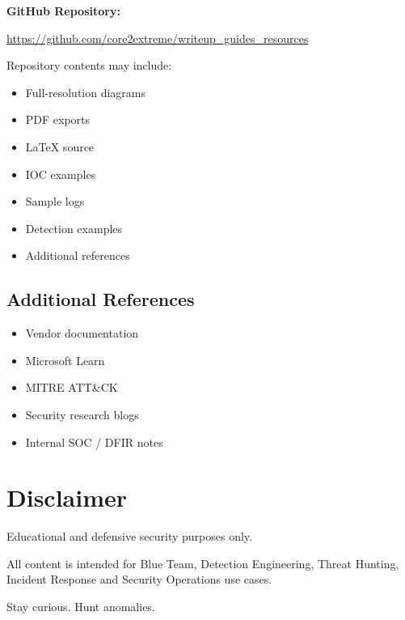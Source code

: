 \documentclass[11pt,a4paper]{article}
\newcommand{\docrepo}{https://github.com/core2extreme/writeup\_guides\_resources}
\newcommand{\docrepourl}{https://github.com/core2extreme/writeup_guides_resources}
\newcommand{\docrepo}{https://github.com/core2extreme/writeup\_guides\_resources}
\newcommand{\docrepourl}{https://github.com/core2extreme/writeup_guides_resources}
\let\oldsection\section
\renewcommand{\section}{\clearpage\oldsection}
\begin{document}
\begin{socbox}
\textbf{GitHub Repository:}

\href{\docrepourl}{\docrepo}

\vspace{0.3cm}

Repository contents may include:

\begin{itemize}
    \item Full-resolution diagrams
    \item PDF exports
    \item LaTeX source
    \item IOC examples
    \item Sample logs
    \item Detection examples
    \item Additional references
\end{itemize}
\end{socbox}

\subsection{Additional References}

\begin{itemize}
    \item Vendor documentation
    \item Microsoft Learn
    \item MITRE ATT\&CK
    \item Security research blogs
    \item Internal SOC / DFIR notes
\end{itemize}

\section{Disclaimer}

\begin{warningbox}
Educational and defensive security purposes only.

All content is intended for Blue Team, Detection Engineering, Threat Hunting, Incident Response and Security Operations use cases.
\end{warningbox}

\vspace{1cm}

\begin{center}
\Huge
\textcolor{primary}{Stay curious. Hunt anomalies.}
\end{center}
\end{document}
